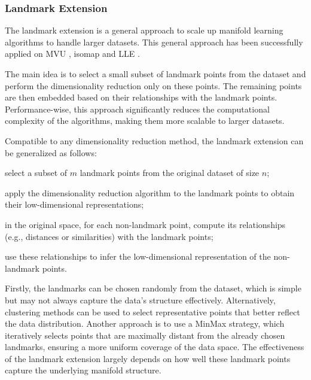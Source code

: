 
        \subsubsection{Landmark Extension}
            The landmark extension is a general approach to scale up manifold learning algorithms to handle larger datasets. This
            general approach \cite{landmark-general} has been successfully applied on MVU \cite{landmark-mvu}, isomap \cite{landmark-isomap} and LLE \cite{landmark-lle}.

            The main idea is to select a small subset of landmark points from the dataset and perform the dimensionality reduction only on these points. The remaining points are then embedded based on their relationships with the landmark points. Performance-wise, this approach significantly reduces the computational complexity of the algorithms, making them more scalable to larger datasets.

            Compatible to any dimensionality reduction method, the landmark extension can be generalized as follows: \begin{inparaenum}[(a)]
                \item select a subset of $m$ landmark points from the original dataset of size $n$;
                \item apply the dimensionality reduction algorithm to the landmark points to obtain their low-dimensional representations;
                \item in the original space, for each non-landmark point, compute its relationships (e.g., distances or similarities) with the landmark points;
                \item use these relationships to infer the low-dimensional representation of the non-landmark points.
            \end{inparaenum}

            Firstly, the landmarks can be chosen randomly from the dataset, which is simple but may not always capture the data's structure effectively. Alternatively, clustering methods can be used to select representative points that better reflect the data distribution. Another approach is to use a MinMax strategy, which iteratively selects points that are maximally distant from the already chosen landmarks, ensuring a more uniform coverage of the data space. The effectiveness of the landmark extension largely depends on how well these landmark points capture the underlying manifold structure.

